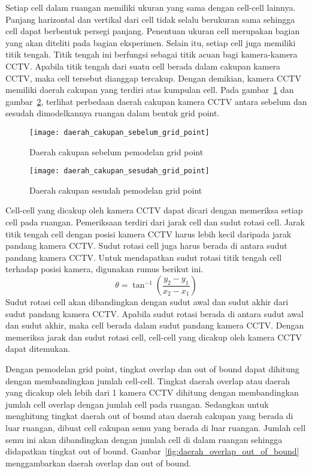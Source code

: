 Setiap cell dalam ruangan memiliki ukuran yang sama dengan cell-cell lainnya. Panjang harizontal dan vertikal dari cell tidak selalu berukuran sama sehingga cell dapat berbentuk persegi panjang. Penentuan ukuran cell merupakan bagian yang akan diteliti pada bagian eksperimen. Selain itu, setiap cell juga memiliki titik tengah. Titik tengah ini berfungsi sebagai titik acuan bagi kamera-kamera CCTV. Apabila titik tengah dari suatu cell berada dalam cakupan kamera CCTV, maka cell tersebut dianggap tercakup. Dengan demikian, kamera CCTV memiliki daerah cakupan yang terdiri atas kumpulan cell. Pada gambar~\ref{fig:daerah_cakupan_sebelum_grid_point} dan gambar~\ref{fig:daerah_cakupan_sesudah_grid_point}, terlihat perbedaan daerah cakupan kamera CCTV antara sebelum dan sesudah dimodelkannya ruangan dalam bentuk grid point.

\begin{figure}[H]
	\centering  
	\texttt{[image: daerah\_cakupan\_sebelum\_grid\_point]}
	\caption[Daerah cakupan sebelum pemodelan grid point]{Daerah cakupan sebelum pemodelan grid point}
	\label{fig:daerah_cakupan_sebelum_grid_point}
\end{figure}

\begin{figure}[H]
	\centering  
	\texttt{[image: daerah\_cakupan\_sesudah\_grid\_point]}
	\caption[Daerah cakupan sesudah pemodelan grid point]{Daerah cakupan sesudah pemodelan grid point}
	\label{fig:daerah_cakupan_sesudah_grid_point}
\end{figure}

Cell-cell yang dicakup oleh kamera CCTV dapat dicari dengan memeriksa setiap cell pada ruangan. Pemeriksaan terdiri dari jarak cell dan sudut rotasi cell. Jarak titik tengah cell dengan posisi kamera CCTV harus lebih kecil daripada jarak pandang kamera CCTV. Sudut rotasi cell juga harus berada di antara sudut pandang kamera CCTV. Untuk mendapatkan sudut rotasi titik tengah cell terhadap posisi kamera, digunakan rumus berikut ini.
\begin{equation*}
	\theta = \tan^{-1}\left(\frac{y_2 - y_1}{x_2 - x_1}\right)
\end{equation*}
Sudut rotasi cell akan dibandingkan dengan sudut awal dan sudut akhir dari sudut pandang kamera CCTV. Apabila sudut rotasi berada di antara sudut awal dan sudut akhir, maka cell berada dalam sudut pandang kamera CCTV. Dengan memeriksa jarak dan sudut rotasi cell, cell-cell yang dicakup oleh kamera CCTV dapat ditemukan.

Dengan pemodelan grid point, tingkat overlap dan out of bound dapat dihitung dengan membandingkan jumlah cell-cell. Tingkat daerah overlap atau daerah yang dicakup oleh lebih dari 1 kamera CCTV dihitung dengan membandingkan jumlah cell overlap dengan jumlah cell pada ruangan. Sedangkan untuk menghitung tingkat daerah out of bound atau daerah cakupan yang berada di luar ruangan, dibuat cell cakupan semu yang berada di luar ruangan. Jumlah cell semu ini akan dibandingkan dengan jumlah cell di dalam ruangan sehingga didapatkan tingkat out of bound. Gambar~\ref{fig:daerah_overlap_out_of_bound} menggambarkan daerah overlap dan out of bound.

